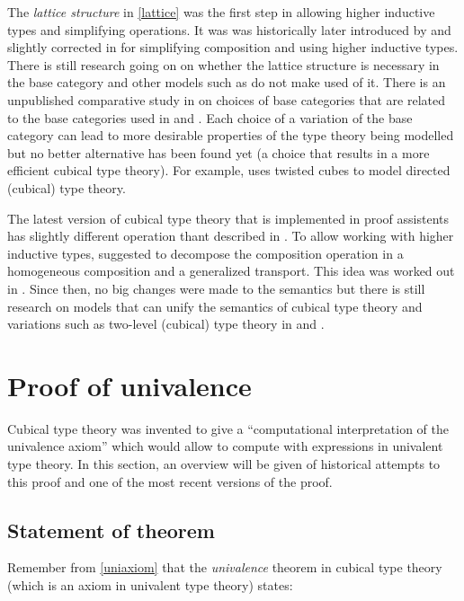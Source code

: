 \documentclass[12pt,a4paper,twoside,xetex]{book} %
\newcommand{\keyword}[1]{\emph{#1}\index{#1}}
\begin{document}
The \keyword{lattice structure} in  \cref{lattice} was the first step in allowing higher inductive types and simplifying operations. It was  was historically 
later introduced by \cite{Cohen2016} and slightly corrected in \cite{Huber2016} for simplifying composition and using 
higher inductive types. There is still research going on on whether the lattice structure is necessary in the base category and other models such as \cite{Altenkirch2015} do not make used of it.
There is an unpublished comparative study in \cite{Awodey2016June} on choices of base categories that are related to the base categories used in \cite{Bezem2014} and \cite{Huber2016}. Each choice of a variation of the base category can lead to more desirable properties of the type theory being modelled but no better alternative has been found yet (a choice that results in a more efficient cubical type theory). For example, \cite{Gun2019} uses twisted cubes to model directed (cubical) type theory.

The latest version of cubical type theory that is implemented in proof assistents has slightly different operation thant described in \cite{Huber2016}. To allow working with higher inductive types, \cite{Huber17note} suggested to decompose the composition operation in a homogeneous composition and a generalized transport. This idea was worked out in \cite{Coquand2018}. Since then, no big changes were made to the semantics but there is still research on models that can unify the semantics of cubical type theory and variations such as two-level (cubical) type theory in \cite{Uem19} and \cite{Cavallo2019}. 


\section{Proof of univalence}\label{univalenceproof}

Cubical type theory was invented to give a ``computational interpretation of 
the univalence axiom'' which would allow to compute with expressions in 
univalent type theory. In this section, an overview will be given of 
historical attempts to this proof and one of the most recent versions of the 
proof.


\subsection{Statement of theorem}

Remember from \cref{uniaxiom} that the \keyword{univalence} theorem in cubical 
type theory (which is an axiom in univalent type theory) states:
\end{document}
